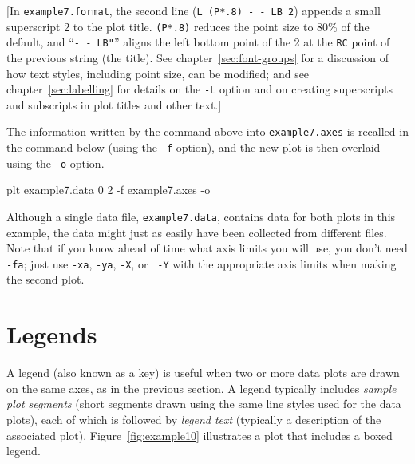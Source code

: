 \documentclass{book}
\begin{document}
%
%
%
%
%
{\small
[In {\tt example7.format}, the second line ({\tt L (P*.8) - - LB 2})
appends a small superscript 2 to the plot title.  {\tt (P*.8)} reduces the
point size to 80\% of the default, and ``{\tt- - LB"}'' aligns the
left bottom point of the 2 at the {\tt RC} point of the previous string
(the title).  See chapter~\ref{sec:font-groups} for a discussion of
how text styles, including point size, can be modified;  and see
chapter~\ref{sec:labelling} for details on the {\tt -L} option and on
creating superscripts and subscripts in plot titles and other text.]}

%
The information written by the command above into {\tt example7.axes}
is recalled in the command below (using the {\tt -f} option), and the
new plot is then overlaid using the {\tt -o} option.

\begin{center}
\begin{boxedverbatim}
plt example7.data 0 2 -f example7.axes -o
\end{boxedverbatim}
\end{center}

%
%
%
%
%
Although a single data file, {\tt example7.data}, contains data for both plots
in this example, the data might just as easily have been collected from
different files.  Note that if you know ahead of time what axis limits you will
use, you don't need {\tt -fa}; just use {\tt -xa}, {\tt -ya}, {\tt -X}, or {\tt
-Y} with the appropriate axis limits when making the second plot.

\section{Legends \label{sec:legends}}

%
%
A legend (also known as a key) is useful when two or more data plots are drawn
on the same axes, as in the previous section.  A legend typically includes {\em
sample plot segments} (short segments drawn using the same line styles used for
the data plots), each of which is followed by {\em legend text} (typically a
description of the associated plot).  Figure~\ref{fig:example10} illustrates a
plot that includes a boxed legend.
\end{document}
